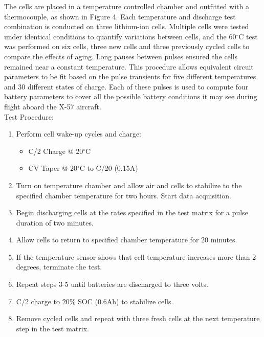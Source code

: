 \documentclass[]{aiaa-tc}%
\begin{document}
The cells are placed in a temperature controlled chamber and outfitted with a thermocouple, as shown in Figure 4. Each temperature and discharge test combination is conducted on three lithium-ion cells. Multiple cells were tested under identical conditions to quantify variations between cells, and the 60$^\circ$C test was performed on six cells, three new cells and three previously cycled cells to compare the effects of aging. Long pauses between pulses ensured the cells remained near a constant temperature. This procedure allows equivalent circuit parameters to be fit based on the pulse transients for five different temperatures and 30 different states of charge. Each of these pulses is used to compute four battery parameters to cover all the possible battery conditions it may see during flight aboard the X-57 aircraft. 
\\
Test Procedure:
\begin{enumerate}
\item Perform cell wake-up cycles and charge:
    \begin{itemize}
        \item C/2 Charge @ 20$^\circ$C
        \item CV Taper @ 20$^\circ$C to C/20 (0.15A)
    \end{itemize}
\item Turn on temperature chamber and allow air and cells to stabilize to the specified chamber temperature for two hours. Start data acquisition.
\item  Begin discharging cells at the rates specified in the test matrix for a pulse duration of two minutes.
\item Allow cells to return to specified chamber temperature for 20 minutes.
\item If the temperature sensor shows that cell temperature increases more than 2 degrees, terminate the test.
\item Repeat steps 3-5 until batteries are discharged to three volts.
\item C/2 charge to $20\%$ SOC (0.6Ah) to stabilize cells.
\item Remove cycled cells and repeat with three fresh cells at the next temperature step in the test matrix.
\end{enumerate}
\end{document}
